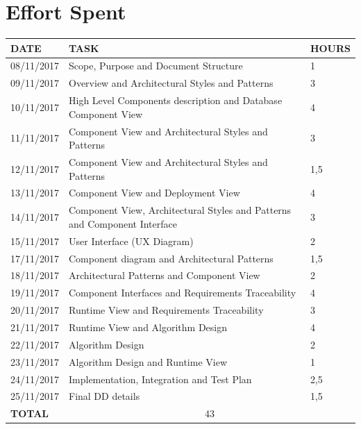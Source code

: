 \documentclass[12pt]{article}
\begin{document}
\section{Effort Spent}

\begin{center}
\begin{tabular}{ |p{}|p{}|p{}| } 
 \hline
 \textbf{DATE} & \textbf{TASK} & \textbf{HOURS} \\ 
  \hline
 08/11/2017 &  Scope, Purpose and Document Structure & 1 \\ 
  \hline
 09/11/2017 & Overview and Architectural Styles and Patterns & 3 \\
  \hline
  10/11/2017 & High Level Components description and Database Component View & 4 \\ 
  \hline
  11/11/2017 & Component View and Architectural Styles and Patterns & 3 \\ 
  \hline
  12/11/2017 & Component View and Architectural Styles and Patterns & 1,5 \\ 
  \hline
  13/11/2017 & Component View and Deployment View & 4 \\ 
  \hline
  14/11/2017 & Component View, Architectural Styles and Patterns and Component Interface & 3 \\ 
  \hline
  15/11/2017 & User Interface (UX Diagram) & 2 \\ 
  \hline
  17/11/2017 & Component diagram and Architectural Patterns & 1,5 \\
  \hline
  18/11/2017 & Architectural Patterns and Component View & 2 \\
  \hline
  19/11/2017 & Component Interfaces and Requirements Traceability & 4 \\
  \hline
  20/11/2017 & Runtime View and Requirements Traceability & 3 \\
  \hline
  21/11/2017 & Runtime View and Algorithm Design & 4 \\
  \hline
  22/11/2017 & Algorithm Design & 2 \\
  \hline
  23/11/2017 & Algorithm Design and Runtime View & 1 \\
  \hline
  24/11/2017 & Implementation, Integration and Test Plan & 2,5 \\
  \hline
  25/11/2017 & Final DD details & 1,5 \\
  \hline
  \textbf{TOTAL} & \multicolumn{2}{c|}{43} \\ 
  \hline
\end{tabular}
\end{center}
\end{document}
